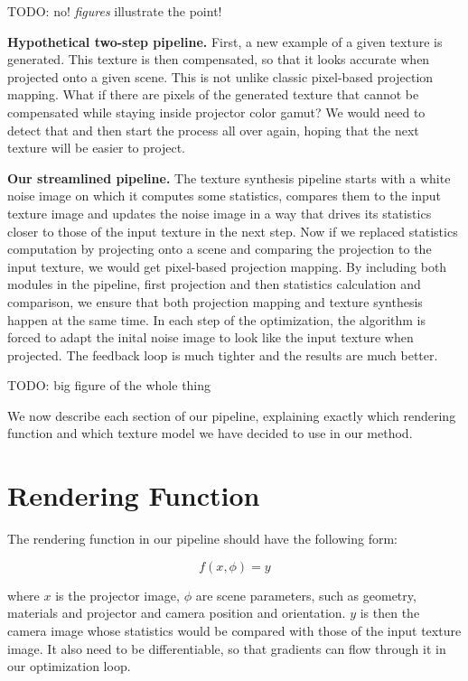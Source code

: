 {\color{red} TODO: no! \textit{figures} illustrate the point!}

\textbf{Hypothetical two-step pipeline.} First, a new example of a given texture is generated. This texture is then compensated, so that it looks accurate when projected onto a given scene. This is not unlike classic pixel-based projection mapping. What if there are pixels of the generated texture that cannot be compensated while staying inside projector color gamut? We would need to detect that and then start the process all over again, hoping that the next texture will be easier to project.

\textbf{Our streamlined pipeline.} The texture synthesis pipeline starts with a white noise image on which it computes some statistics, compares them to the input texture image and updates the noise image in a way that drives its statistics closer to those of the input texture in the next step. Now if we replaced statistics computation by projecting onto a scene and comparing the projection to the input texture, we would get pixel-based projection mapping. By including both modules in the pipeline, first projection and then statistics calculation and comparison, we ensure that both projection mapping and texture synthesis happen at the same time. In each step of the optimization, the algorithm is forced to adapt the inital noise image to look like the input texture when projected. The feedback loop is much tighter and the results are much better.

{\color{red} TODO: big figure of the whole thing}

We now describe each section of our pipeline, explaining exactly which rendering function and which texture model we have decided to use in our method.

\section{Rendering Function}
\label{section:methods-rendering_function}

The rendering function in our pipeline should have the following form:

\begin{equation}
    \label{eq:rendering_function}
    f(x, \phi) = y  
\end{equation}

where \(x\) is the projector image, \(\phi\) are scene parameters, such as geometry, materials and projector and camera position and orientation. \(y\) is then the camera image whose statistics would be compared with those of the input texture image. It also need to be differentiable, so that gradients can flow through it in our optimization loop.

